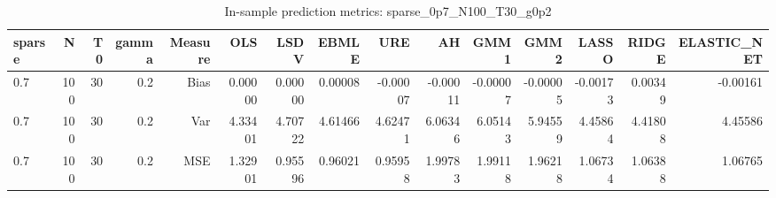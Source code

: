 \begin{table}[!htbp]\centering
\caption{In-sample prediction metrics: sparse_0p7_N100_T30_g0p2}
\label{tab:table2_sparse_0p7_N100_T30_g0p2}
\begin{tabular}{lrrrrrrrrrrrrrr}
\hline
sparse & N & T0 & gamma & Measure & OLS & LSDV & EBMLE & URE & AH & GMM1 & GMM2 & LASSO & RIDGE & ELASTIC_NET \\
\hline
0.7 & 100 & 30 & 0.2 & Bias & 0.00000 & 0.00000 & 0.00008 & -0.00007 & -0.00011 & -0.00007 & -0.00005 & -0.00173 & 0.00349 & -0.00161 \\
0.7 & 100 & 30 & 0.2 & Var & 4.33401 & 4.70722 & 4.61466 & 4.62471 & 6.06346 & 6.05143 & 5.94559 & 4.45864 & 4.41808 & 4.45586 \\
0.7 & 100 & 30 & 0.2 & MSE & 1.32901 & 0.95596 & 0.96021 & 0.95958 & 1.99783 & 1.99118 & 1.96218 & 1.06734 & 1.06388 & 1.06765 \\
\hline
\end{tabular}
\end{table}

